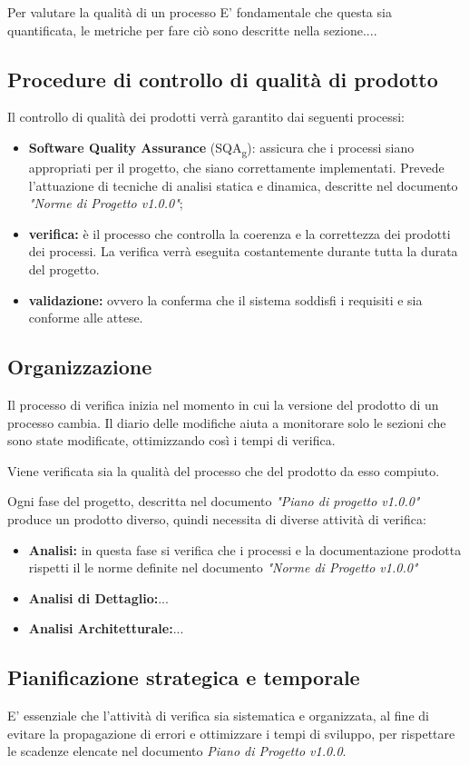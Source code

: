 \documentclass[12pt,a4paper,titlepage]{article}
\begin{document}
	Per valutare la qualità di un processo E' fondamentale che questa sia quantificata, le metriche per fare ciò sono descritte nella sezione....
	
	\subsection{Procedure di controllo di qualità di prodotto}
	Il controllo di qualità dei prodotti verrà garantito dai seguenti processi:
	\begin{itemize}
		\item \textbf{Software Quality Assurance} (SQA\textsubscript{g}): assicura che i processi siano appropriati per il progetto, che siano correttamente implementati. Prevede l'attuazione di tecniche di analisi statica e dinamica, descritte nel documento \textit{"Norme di Progetto v1.0.0"};
		\item \textbf{verifica:} è il processo che controlla la coerenza e la correttezza dei prodotti dei processi. La verifica verrà eseguita costantemente durante tutta la durata del progetto.
		\item \textbf{validazione:} ovvero la conferma che il sistema soddisfi i requisiti e sia conforme alle attese.
	\end{itemize}

	\subsection{Organizzazione}
	Il processo di verifica inizia nel momento in cui la versione del prodotto di un processo cambia. Il diario delle modifiche aiuta a monitorare solo le sezioni che sono state modificate, ottimizzando così i tempi di verifica. 
	
	Viene verificata sia la qualità del processo che del prodotto da esso compiuto.
	
	Ogni fase del progetto, descritta nel documento \textit{"Piano di progetto v1.0.0"} produce un prodotto diverso, quindi necessita di diverse attività di verifica:
	\begin{itemize}
		\item \textbf{Analisi:} in questa fase si verifica che i processi e la documentazione prodotta rispetti il le norme definite nel documento \textit{"Norme di Progetto v1.0.0"}
		\item \textbf{Analisi di Dettaglio:}...
		\item \textbf{Analisi Architetturale:}...
	\end{itemize}
	\subsection{Pianificazione strategica e temporale}
	E' essenziale che l'attività di verifica sia sistematica e organizzata, al fine di evitare la propagazione di errori e ottimizzare i tempi di sviluppo, per rispettare le scadenze elencate nel documento \textit{Piano di Progetto v1.0.0}.
	
\end{document}
